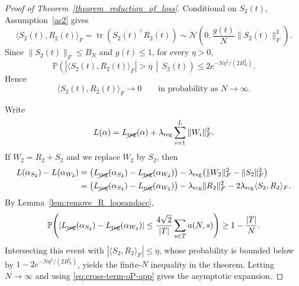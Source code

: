 \documentclass[11pt]{article}
\theoremstyle{plain}
\theoremstyle{definition}
\theoremstyle{remark}
\newcommand{\PP}{\mathbb{P}}
\newcommand{\tr}{\operatorname{tr}}
\newcommand{\1}{\mathbf{1}}
\begin{document}
\begin{proof}[Proof of Theorem~\ref{theorem_reduction_of_loss}]
Conditional on \(S_2(t)\), Assumption~\ref{as2} gives
\[
\langle S_2(t),R_2(t)\rangle_F
=
\tr(S_2(t)^\top R_2(t))
\sim
\mathcal N\!\left(0,\frac{g(t)}{N}\|S_2(t)\|_F^2\right).
\]
Since \(\|S_2(t)\|_F\le B_N\) and \(g(t)\le1\), for every \(\eta>0\),
\begin{equation}
\label{eq:cross-term-concentration-app}
\PP\!\left(
|\langle S_2(t),R_2(t)\rangle_F|>\eta
\,\middle|\,S_2(t)
\right)
\le
2e^{-N\eta^2/(2B_N^2)}.
\end{equation}
Hence
\begin{equation}
\label{eq:cross-term-oP-app}
\langle S_2(t),R_2(t)\rangle_F\to 0
\qquad\text{in probability as }N\to\infty.
\end{equation}

Write
\[
L(\alpha)=L_{\cancel{\mathrm{reg}}}(\alpha)+\lambda_{\mathrm{reg}}\sum_{i=1}^L \|W_i\|_F^2.
\]
If \(W_2=R_2+S_2\) and we replace \(W_2\) by \(S_2\), then
\begin{align}
L(\alpha_{S_2})-L(\alpha_{W_2})
&=
\big(L_{\cancel{\mathrm{reg}}}(\alpha_{S_2})-L_{\cancel{\mathrm{reg}}}(\alpha_{W_2})\big)
-
\lambda_{\mathrm{reg}}\big(\|W_2\|_F^2-\|S_2\|_F^2\big)\notag\\
&=
\big(L_{\cancel{\mathrm{reg}}}(\alpha_{S_2})-L_{\cancel{\mathrm{reg}}}(\alpha_{W_2})\big)
-
\lambda_{\mathrm{reg}}\|R_2\|_F^2
-
2\lambda_{\mathrm{reg}}\langle S_2,R_2\rangle_F.
\label{eq:loss-diff-exact-app}
\end{align}
By Lemma~\ref{lem:remove_R_loosandacc},
\[
\PP\!\left(
|L_{\cancel{\mathrm{reg}}}(\alpha_{S_2})-L_{\cancel{\mathrm{reg}}}(\alpha_{W_2})|
\le
\frac{4\sqrt{2}}{|T|}\sum_{s\in T}a(N,s)
\right)
\ge
1-\frac{|T|}{N}.
\]
Intersecting this event with \(|\langle S_2,R_2\rangle_F|\le \eta\), whose probability is bounded below by \(1-2e^{-N\eta^2/(2B_N^2)}\), yields the finite-\(N\) inequality in the theorem. Letting \(N\to\infty\) and using \eqref{eq:cross-term-oP-app} gives the asymptotic expansion.
\end{proof}
\end{document}
